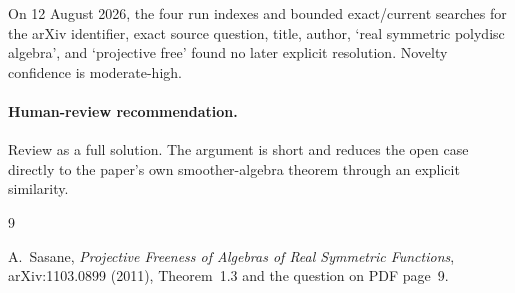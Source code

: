 \documentclass[11pt]{article}
\begin{document}
On 12 August 2026, the four run indexes and bounded exact/current searches
for the arXiv identifier, exact source question, title, author, `real
symmetric polydisc algebra', and `projective free' found no later explicit
resolution.  Novelty confidence is moderate-high.

\paragraph{Human-review recommendation.}
Review as a full solution.  The argument is short and reduces the open case
directly to the paper's own smoother-algebra theorem through an explicit
similarity.

\begin{thebibliography}{9}

A.~Sasane,
\emph{Projective Freeness of Algebras of Real Symmetric Functions},
arXiv:1103.0899 (2011), Theorem~1.3 and the question on PDF page~9.

\end{thebibliography}
\end{document}
